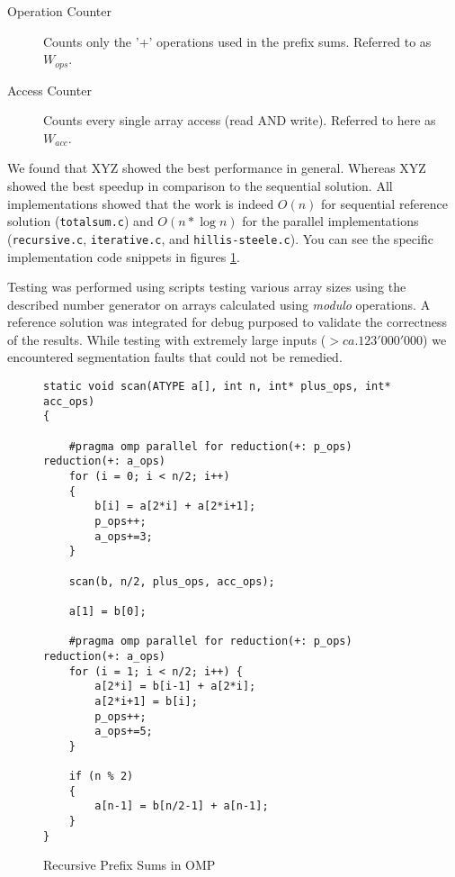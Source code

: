 \documentclass[11pt]{article}
\begin{document}
\begin{description}
\item[Operation Counter] Counts only the '+' operations used in the prefix sums. Referred to as $W_{ops}$.
\item[Access Counter] Counts every single array access (read AND write). Referred to here as $W_{acc}$.
\end{description}

We found that XYZ showed the best performance in general. Whereas XYZ showed the best speedup in comparison to the sequential solution. All implementations showed that the work is indeed $O(n)$ for sequential reference solution (\verb=totalsum.c=) and $O(n * \log n)$ for the parallel implementations (\verb=recursive.c=, \verb=iterative.c=, and \verb=hillis-steele.c=). You can see the specific implementation code snippets in figures \ref{omp_prefix_recursive_code}.

Testing was performed using scripts testing various array sizes using the described number generator on arrays calculated using \emph{modulo} operations. A reference solution was integrated for debug purposed to validate the correctness of the results. While testing with extremely large inputs ($> ca. 123'000'000$) we encountered segmentation faults that could not be remedied.

\begin{figure}[h]
\label{omp_prefix_recursive_code}
\caption{Recursive Prefix Sums in OMP}
\begin{lstlisting}
static void scan(ATYPE a[], int n, int* plus_ops, int* acc_ops)
{

	#pragma omp parallel for reduction(+: p_ops) reduction(+: a_ops)
	for (i = 0; i < n/2; i++) 
	{
		b[i] = a[2*i] + a[2*i+1];
		p_ops++;
		a_ops+=3;
	}

	scan(b, n/2, plus_ops, acc_ops);

	a[1] = b[0];

	#pragma omp parallel for reduction(+: p_ops) reduction(+: a_ops)
	for (i = 1; i < n/2; i++) {
		a[2*i] = b[i-1] + a[2*i];
		a[2*i+1] = b[i];
		p_ops++;
		a_ops+=5;
	}

	if (n % 2)
	{
		a[n-1] = b[n/2-1] + a[n-1];
	}
}
\end{lstlisting}
\end{figure}
\end{document}
